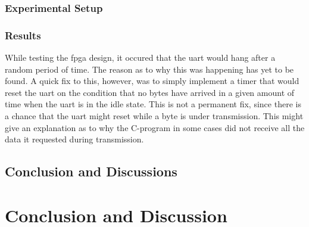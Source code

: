 \documentclass[main.tex]{subfiles}
\begin{document}
\subsection{Experimental Setup}

\subsection{Results}

While testing the \gls{fpga} design, it occured that the \gls{uart} would hang after a random period of time. The reason as to why this was happening has yet to be found. A quick fix to this, however, was to simply implement a timer that would reset the \gls{uart} on the condition that no bytes have arrived in a given amount of time when the \gls{uart} is in the idle state. This is not a permanent fix, since there is a chance that the \gls{uart} might reset while a byte is under transmission. This might give an explanation as to why the C-program in some cases did not receive all the data it requested during transmission.

\section{Conclusion and Discussions}

\chapter{Conclusion and Discussion}
\end{document}
